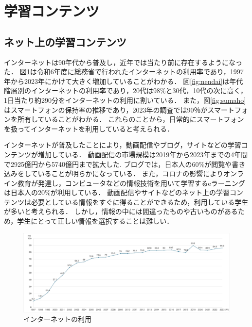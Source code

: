 \documentclass[12pt,a4j,titlepage]{ltjsarticle}
\begin{document}

\clearpage

\section{学習コンテンツ}

\subsection{ネット上の学習コンテンツ}
インターネットは90年代から普及し，近年では当たり前に存在するようになった．
図\ref{fig:net}は令和6年度に総務省で行われたインターネットの利用率であり，1997年から2023年にかけて大きく増加していることがわかる．
図\ref{fig:nendai}は年代階層別のインターネットの利用率であり，20代は98\%と30代，10代の次に高く，1日当たり約290分をインターネットの利用に割いている．
また，図\ref{fig:sumaho}はスマートフォンの保持率の推移であり，2023年の調査では90％がスマートフォンを所有していることがわかる\cite{somu6}．
これらのことから，日常的にスマートフォンを扱ってインターネットを利用していると考えられる．

インターネットが普及したことにより，動画配信やブログ，サイトなどの学習コンテンツが増加している．
動画配信の市場規模は2019年から2023年までの4年間で2925億円から5740億円まで拡大した\cite{somu2}.
ブログでは，日本人の60\%が閲覧や書き込みをしていることが明らかになっている．
また，コロナの影響によりオンライン教育が発達し，コンピュータなどの情報技術を用いて学習するeラーニングは日本人の20\%が利用している\cite{somu2}．
動画配信やサイトなどのネット上の学習コンテンツは必要としている情報をすぐに得ることができるため，利用している学生が多いと考えられる．
しかし，情報の中には間違ったものや古いものがあるため，学生にとって正しい情報を選択することは難しい．

\begin{figure}[!htb]
  \centering
  \includegraphics[width=15cm]{ネット利用率.pdf}
  \caption{インターネットの利用}
  \label{fig:net}
\end{figure}
\end{document}
